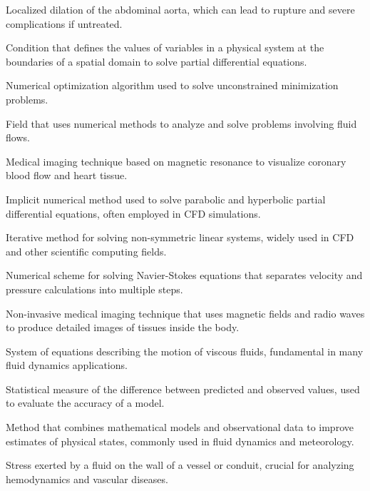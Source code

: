 %
%


 Localized dilation of the abdominal aorta, which can lead to rupture and severe complications if untreated.

 Condition that defines the values of variables in a physical system at the boundaries of a spatial domain to solve partial differential equations.

 Numerical optimization algorithm used to solve unconstrained minimization problems.

 Field that uses numerical methods to analyze and solve problems involving fluid flows.

 Medical imaging technique based on magnetic resonance to visualize coronary blood flow and heart tissue.

 Implicit numerical method used to solve parabolic and hyperbolic partial differential equations, often employed in CFD simulations.

 Iterative method for solving non-symmetric linear systems, widely used in CFD and other scientific computing fields.

 Numerical scheme for solving Navier-Stokes equations that separates velocity and pressure calculations into multiple steps.

 Non-invasive medical imaging technique that uses magnetic fields and radio waves to produce detailed images of tissues inside the body.

 System of equations describing the motion of viscous fluids, fundamental in many fluid dynamics applications.

 Statistical measure of the difference between predicted and observed values, used to evaluate the accuracy of a model.

 Method that combines mathematical models and observational data to improve estimates of physical states, commonly used in fluid dynamics and meteorology.

 Stress exerted by a fluid on the wall of a vessel or conduit, crucial for analyzing hemodynamics and vascular diseases.